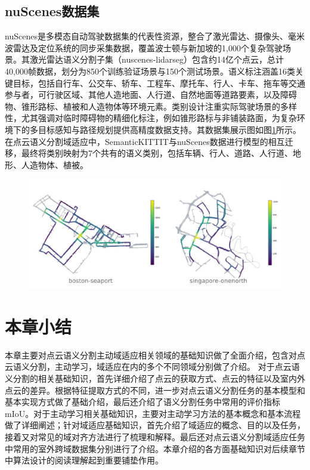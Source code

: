 \subsection{nuScenes数据集}
nuScenes是多模态自动驾驶数据集的代表性资源，整合了激光雷达、摄像头、毫米波雷达及定位系统的同步采集数据，覆盖波士顿与新加坡的1,000个复杂驾驶场景。其激光雷达语义分割子集（nuscenes-lidarseg）包含约14亿个点云，总计40,000帧数据，划分为850个训练验证场景与150个测试场景。语义标注涵盖16类关键目标，包括自行车、公交车、轿车、工程车、摩托车、行人、卡车、拖车等交通参与者，可行驶区域、其他人造地面、人行道、自然地面等道路要素，以及障碍物、锥形路标、植被和人造物体等环境元素。类别设计注重实际驾驶场景的多样性，尤其强调对临时障碍物的精细化标注，例如锥形路标与非铺装路面，为复杂环境下的多目标感知与路径规划提供高精度数据支持。其数据集展示图如图\ref{fig:2-7}所示。
在点云语义分割域适应中，SemanticKITTIT与nuScenes数据进行模型的相互迁移，最终将类别映射为7个共有的语义类别，包括车辆、行人、道路、人行道、地形、人造物体、植被。
\vspace{-0.1cm}
\begin{figure}[h]
    \centering
    \includegraphics[width = \textwidth, scale=0.5]{ljx/figure/2-5/nuScenes.pdf}
    \label{fig:2-7}
\end{figure}
\vspace{-0.35cm} 
\section{本章小结}
本章主要对点云语义分割主动域适应相关领域的基础知识做了全面介绍，包含对点云语义分割，主动学习，域适应在内的多个不同领域分别做了介绍。 对于点云语义分割的相关基础知识，首先详细介绍了点云的获取方式、点云的特征以及室内外点云的差异。根据特征提取方式的不同，进一步对点云语义分割任务的基本模型和基本实现方式做了基础介绍，最后还介绍了语义分割任务中常用的评价指标mIoU。对于主动学习相关基础知识，主要对主动学习方法的基本概念和基本流程做了详细阐述；针对域适应基础知识，首先介绍了域适应的概念、目的以及任务，接着又对常见的域对齐方法进行了梳理和解释。最后还对点云语义分割域适应任务中常用的室外跨域数据集分别进行了介绍。本章介绍的各方面基础知识对后续章节中算法设计的阅读理解起到重要铺垫作用。
